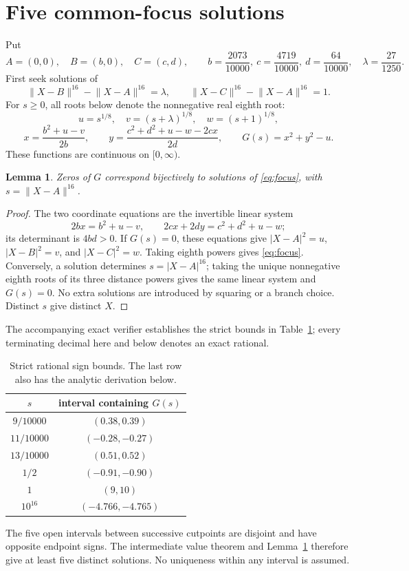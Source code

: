 \documentclass[11pt]{article}
\newtheorem{lemma}{Lemma}
\newcommand{\N}[2]{\lVert #1-#2\rVert^{16}}
\begin{document}
\section{Five common-focus solutions}
Put
\begin{equation}\label{eq:data}
 A=(0,0),\quad B=(b,0),\quad C=(c,d),\qquad
 b=\frac{2073}{10000},\ c=\frac{4719}{10000},\ d=\frac{64}{10000},\quad
 \lambda=\frac{27}{1250}.
\end{equation}
First seek solutions of
\begin{equation}\label{eq:focus}
 \N{X}{B}-\N{X}{A}=\lambda,\qquad
 \N{X}{C}-\N{X}{A}=1.
\end{equation}
For $s\geq0$, all roots below denote the nonnegative real eighth root:
\[
 u=s^{1/8},\quad v=(s+\lambda)^{1/8},\quad w=(s+1)^{1/8},
\]
\begin{equation}\label{eq:G}
 x=\frac{b^2+u-v}{2b},\qquad
 y=\frac{c^2+d^2+u-w-2cx}{2d},\qquad G(s)=x^2+y^2-u.
\end{equation}
These functions are continuous on $[0,\infty)$.

\begin{lemma}\label{lem:equiv}
Zeros of $G$ correspond bijectively to solutions of \eqref{eq:focus}, with $s=\N{X}{A}$.
\end{lemma}
\begin{proof}
The two coordinate equations are the invertible linear system
\[
 2bx=b^2+u-v,\qquad 2cx+2dy=c^2+d^2+u-w;
\]
its determinant is $4bd>0$. If $G(s)=0$, these equations give
$|X-A|^2=u$, $|X-B|^2=v$, and $|X-C|^2=w$. Taking eighth powers gives \eqref{eq:focus}. Conversely, a solution determines $s=|X-A|^{16}$; taking the unique nonnegative eighth roots of its three distance powers gives the same linear system and $G(s)=0$. No extra solutions are introduced by squaring or a branch choice. Distinct $s$ give distinct $X$.
\end{proof}

The accompanying exact verifier establishes the strict bounds in Table~\ref{tab:signs}; every terminating decimal here and below denotes an exact rational.
\begin{table}[ht]
\centering
\begin{tabular}{c@{\qquad}c}
\toprule
$s$ & interval containing $G(s)$\\
\midrule
$9/10000$ & $(0.38,0.39)$\\
$11/10000$ & $(-0.28,-0.27)$\\
$13/10000$ & $(0.51,0.52)$\\
$1/2$ & $(-0.91,-0.90)$\\
$1$ & $(9,10)$\\
$10^{16}$ & $(-4.766,-4.765)$\\
\bottomrule
\end{tabular}
\caption{Strict rational sign bounds. The last row also has the analytic derivation below.}\label{tab:signs}
\end{table}
The five open intervals between successive cutpoints are disjoint and have opposite endpoint signs. The intermediate value theorem and Lemma~\ref{lem:equiv} therefore give at least five distinct solutions. No uniqueness within any interval is assumed.
\end{document}
